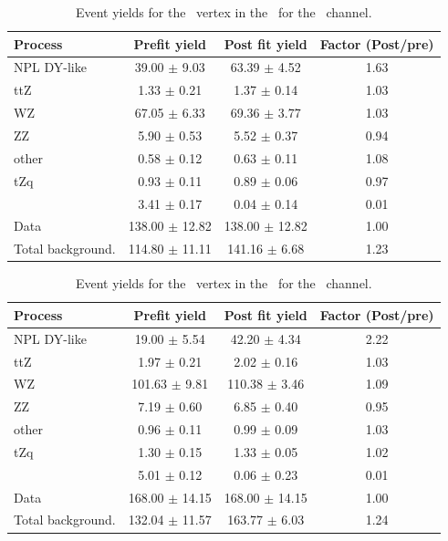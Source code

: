 \begin{table}[htbp]
	\centering
	\caption{Event yields for the \Zct\ vertex in the \WZCR\  for the \eee\ channel. }
	\begin{tabular} {l c c c }
		\toprule
		Process & Prefit yield & Post fit yield & Factor (Post/pre) \\
		\midrule
		NPL DY-like & 39.00 $ \pm $ 9.03 & 63.39 $ \pm $ 4.52 & 1.63 \\ 
		ttZ & 1.33 $ \pm $ 0.21 & 1.37 $ \pm $ 0.14 & 1.03 \\ 
		WZ & 67.05 $ \pm $ 6.33 & 69.36 $ \pm $ 3.77 & 1.03 \\ 
		ZZ & 5.90 $ \pm $ 0.53 & 5.52 $ \pm $ 0.37 & 0.94 \\ 
		other & 0.58 $ \pm $ 0.12 & 0.63 $ \pm $ 0.11 & 1.08 \\ 
		tZq & 0.93 $ \pm $ 0.11 & 0.89 $ \pm $ 0.06 & 0.97 \\ 
		\kZct  & 3.41 $ \pm $ 0.17 & 0.04 $ \pm $ 0.14 & 0.01\\
		\hdashline
		Data & 138.00 $ \pm $ 12.82 & 138.00 $ \pm $ 12.82 & 1.00\\
		Total background. & 114.80 $ \pm $ 11.11 & 141.16 $ \pm $ 6.68 & 1.23\\
		\bottomrule
	\end{tabular}
\end{table}
\begin{table}[htbp]
	\centering
	\caption{Event yields for the \Zct\ vertex in the \WZCR\  for the \eemu\ channel. }
	\begin{tabular} {l c c c }
		\toprule
		Process & Prefit yield & Post fit yield & Factor (Post/pre) \\
		\midrule
		NPL DY-like & 19.00 $ \pm $ 5.54 & 42.20 $ \pm $ 4.34 & 2.22 \\ 
		ttZ & 1.97 $ \pm $ 0.21 & 2.02 $ \pm $ 0.16 & 1.03 \\ 
		WZ & 101.63 $ \pm $ 9.81 & 110.38 $ \pm $ 3.46 & 1.09 \\ 
		ZZ & 7.19 $ \pm $ 0.60 & 6.85 $ \pm $ 0.40 & 0.95 \\ 
		other & 0.96 $ \pm $ 0.11 & 0.99 $ \pm $ 0.09 & 1.03 \\ 
		tZq & 1.30 $ \pm $ 0.15 & 1.33 $ \pm $ 0.05 & 1.02 \\ 
		\kZct  & 5.01 $ \pm $ 0.12 & 0.06 $ \pm $ 0.23 & 0.01\\
		\hdashline
		Data & 168.00 $ \pm $ 14.15 & 168.00 $ \pm $ 14.15 & 1.00\\
		Total background. & 132.04 $ \pm $ 11.57 & 163.77 $ \pm $ 6.03 & 1.24\\
		\bottomrule
	\end{tabular}
\end{table}
